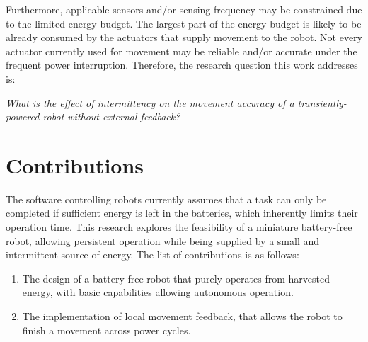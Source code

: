 Furthermore, applicable sensors and/or sensing frequency may be constrained due to the limited energy budget.
The largest part of the energy budget is likely to be already consumed by the actuators that supply movement to the robot.
Not every actuator currently used for movement may be reliable and/or accurate under the frequent power interruption.
Therefore, the research question this work addresses is:

\begin{center}
	\textit{What is the effect of intermittency on the movement accuracy of a transiently-powered robot without external feedback?}
\end{center}

\section{Contributions}
The software controlling robots currently assumes that a task can only be completed if sufficient energy is left in the batteries, which inherently limits their operation time. 
This research explores the feasibility of a miniature battery-free robot, allowing persistent operation while being supplied by a small and intermittent source of energy.
The list of contributions is as follows:

\begin{enumerate}


\item The design of a battery-free robot that purely operates from harvested energy, with basic capabilities allowing autonomous operation.

\item The implementation of local movement feedback, that allows the robot to finish a movement across power cycles.


\end{enumerate}


